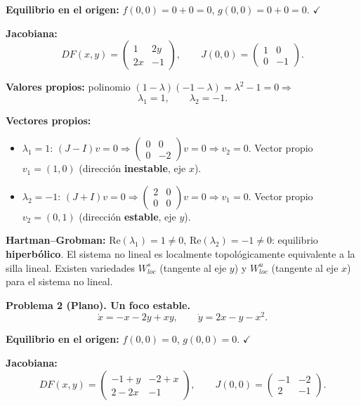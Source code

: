 \documentclass[12pt,letterpaper]{article}
\begin{document}
\textbf{Equilibrio en el origen:}
$f(0,0)=0+0=0$, $g(0,0)=0+0=0$. $\checkmark$

\textbf{Jacobiana:}
\[
  DF(x,y)=\begin{pmatrix}1&2y\\2x&-1\end{pmatrix},
  \qquad
  J(0,0)=\begin{pmatrix}1&0\\0&-1\end{pmatrix}.
\]

\textbf{Valores propios:} polinomio $(1-\lambda)(-1-\lambda)=\lambda^2-1=0 \Rightarrow$
\[
  \boxed{\lambda_1=1,\qquad \lambda_2=-1.}
\]

\textbf{Vectores propios:}
\begin{itemize}
  \item $\lambda_1=1$: $(J-I)v=0 \Rightarrow \begin{pmatrix}0&0\\0&-2\end{pmatrix}v=0
    \Rightarrow v_2=0$. Vector propio $v_1=(1,0)$ (dirección \textbf{inestable}, eje $x$).
  \item $\lambda_2=-1$: $(J+I)v=0 \Rightarrow \begin{pmatrix}2&0\\0&0\end{pmatrix}v=0
    \Rightarrow v_1=0$. Vector propio $v_2=(0,1)$ (dirección \textbf{estable}, eje $y$).
\end{itemize}

\textbf{Hartman--Grobman:} $\text{Re}(\lambda_1)=1\neq0$, $\text{Re}(\lambda_2)=-1\neq0$:
equilibrio \textbf{hiperbólico}. El sistema no lineal es localmente topológicamente equivalente
a la silla lineal. Existen variedades $W^s_{loc}$ (tangente al eje $y$) y $W^u_{loc}$
(tangente al eje $x$) para el sistema no lineal.

\bigskip
\noindent\textbf{Problema 2 (Plano). Un foco estable.}
\[
  \dot x = -x-2y+xy, \qquad \dot y = 2x-y-x^2.
\]

\textbf{Equilibrio en el origen:} $f(0,0)=0$, $g(0,0)=0$. $\checkmark$

\textbf{Jacobiana:}
\[
  DF(x,y)=\begin{pmatrix}-1+y&-2+x\\2-2x&-1\end{pmatrix},
  \qquad
  J(0,0)=\begin{pmatrix}-1&-2\\2&-1\end{pmatrix}.
\]
\end{document}

